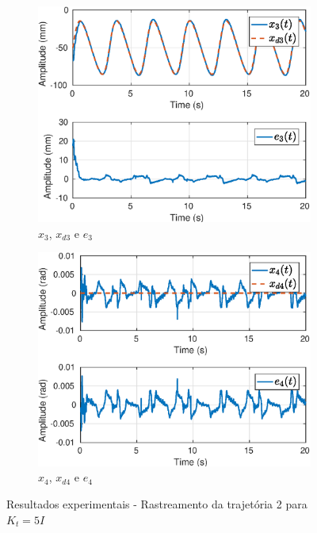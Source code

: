 \begin{figure}[H]
\begin{subfigure}{.5\textwidth}
  \centering
  \includegraphics[width=\linewidth]{./img/traj_2_k5/x3.eps}
  \caption{$x_3$, $x_{d3}$ e $e_3$}
  \label{fig:sub1}
\end{subfigure}%
\begin{subfigure}{.5\textwidth}
  \centering
  \includegraphics[width=\linewidth]{./img/traj_2_k5/x4.eps}
  \caption{$x_4$, $x_{d4}$ e $e_4$}
  \label{fig:sub2}
\end{subfigure}
\caption{Resultados experimentais - Rastreamento da trajetória 2 para ${K}_t = 5 {I}$}
\label{fig:test}
\end{figure}


